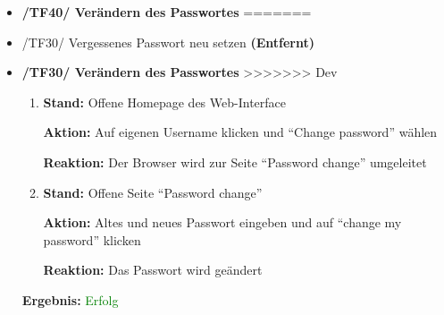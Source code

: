 \documentclass[a4paper]{scrreprt}
\begin{document}
\begin{itemize}
		      				\item \textbf{/TF40/ Ver\"andern des Passwortes}
=======
		      		
		                      \item /TF30/ Vergessenes Passwort neu setzen \textbf{(Entfernt)}
		      		        \vspace*{0.6cm}
		      		
		      				\item \textbf{/TF30/ Ver\"andern des Passwortes}
>>>>>>> Dev
		                              \begin{enumerate}
		                                  \item \par \textbf{Stand: }Offene Homepage des Web-Interface
		                                      \par \textbf{Aktion: }Auf eigenen Username klicken und ``Change password'' w\"ahlen
		                                      \par \textbf{Reaktion: }Der Browser wird zur Seite ``Password change'' umgeleitet
		      							\item \par \textbf{Stand: }Offene Seite ``Password change''
		                                      \par \textbf{Aktion: }Altes und neues Passwort eingeben und auf ``change my password'' klicken
		                                      \par \textbf{Reaktion: }Das Passwort wird ge\"andert
		                              \end{enumerate}		
		      		           \vspace*{0.3cm}
		      		           \par \textbf{Ergebnis: }\textcolor{green}{Erfolg}
		      		           \vspace*{0.6cm}		
		      		

\end{itemize}
\end{document}

